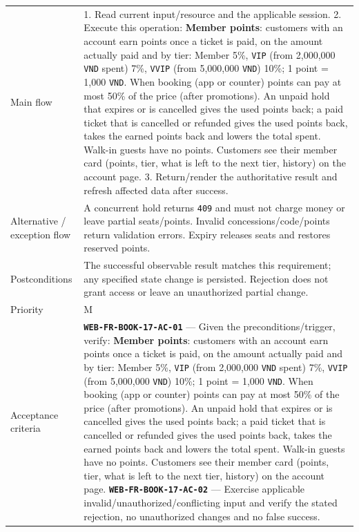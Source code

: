 \begin{longtable}{@{}P{0.23000\SRSWidth}P{0.77000\SRSWidth}@{}}
Main flow & 1. Read current input/\allowbreak{}resource and the applicable session. 2. Execute this operation: \textbf{Member points}: customers with an account earn points once a ticket is paid, on the amount actually paid and by tier: Member 5\%, \texttt{VIP} (from 2,000,000 \texttt{VND} spent) 7\%, \texttt{VVIP} (from 5,000,000 \texttt{VND}) 10\%; 1 point = 1,000 \texttt{VND}. When booking (app or counter) points can pay at most 50\% of the price (after promotions). An unpaid hold that expires or is cancelled gives the used points back; a paid ticket that is cancelled or refunded gives the used points back, takes the earned points back and lowers the total spent. Walk-in guests have no points. Customers see their member card (points, tier, what is left to the next tier, history) on the account page. 3. Return/\allowbreak{}render the authoritative result and refresh affected data after success. \\[3pt]
Alternative /\allowbreak{} exception flow & A concurrent hold returns \texttt{409} and must not charge money or leave partial seats/\allowbreak{}points. Invalid concessions/\allowbreak{}code/\allowbreak{}points return validation errors. Expiry releases seats and restores reserved points. \\[3pt]
Postconditions & The successful observable result matches this requirement; any specified state change is persisted. Rejection does not grant access or leave an unauthorized partial change. \\[3pt]
Priority & M \\[3pt]
Acceptance criteria & \textbf{\texttt{WEB-\allowbreak{}FR-\allowbreak{}BOOK-\allowbreak{}17-\allowbreak{}AC-\allowbreak{}01}} — Given the preconditions/\allowbreak{}trigger, verify: \textbf{Member points}: customers with an account earn points once a ticket is paid, on the amount actually paid and by tier: Member 5\%, \texttt{VIP} (from 2,000,000 \texttt{VND} spent) 7\%, \texttt{VVIP} (from 5,000,000 \texttt{VND}) 10\%; 1 point = 1,000 \texttt{VND}. When booking (app or counter) points can pay at most 50\% of the price (after promotions). An unpaid hold that expires or is cancelled gives the used points back; a paid ticket that is cancelled or refunded gives the used points back, takes the earned points back and lowers the total spent. Walk-in guests have no points. Customers see their member card (points, tier, what is left to the next tier, history) on the account page. \textbf{\texttt{WEB-\allowbreak{}FR-\allowbreak{}BOOK-\allowbreak{}17-\allowbreak{}AC-\allowbreak{}02}} — Exercise applicable invalid/\allowbreak{}unauthorized/\allowbreak{}conflicting input and verify the stated rejection, no unauthorized changes and no false success. \\[3pt]

\end{longtable}
